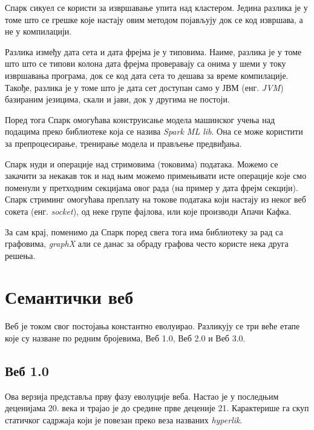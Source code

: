 \documentclass[12pt,oneside]{memoir}
\begin{document}
Спарк сикуел се користи за извршавање упита над кластером. Једина разлика је у томе што се грешке које настају овим методом појављују док се код извршава, а не у компилацији. \cite{spark_guide}

Разлика између дата сета и дата фрејма је у типовима. Наиме, разлика је у томе што што се типови колона дата фрејма проверавају са онима у шеми у току извршавања програма, док се код дата сета то дешава за време компилације. Такође, разлика је у томе што је дата сет доступан само у ЈВМ (енг. \textit{JVM}) базираним језицима, скали и јави, док у другима не постоји. \cite{spark_guide}

Поред тога Спарк омогућава конструисање модела машинског учења над подацима преко библиотеке која се назива \textit{Spark ML lib}. Она се може користити за препроцесирање, тренирање модела и прављење предвиђања. \cite{spark_guide}

Спарк нуди и операције над стримовима (токовима) података. Можемо се закачити за некакав ток и над њим можемо примењивати исте операције које смо поменули у претходним секцијама овог рада (на пример у дата фрејм секцији). Спарк стриминг омогућава преплату на токове података који настају из неког веб сокета (енг. \textit{socket}), од неке групе фајлова, или које производи Апачи Кафка. \cite{spark_streaming}

За сам крај, поменимо да Спарк поред свега тога има библиотеку за рад са графовима, \textit{graphX} али се данас за обраду графова често користе нека друга решења. \cite{spark_guide}


\chapter{Семантички веб}
\label{chp:sem_veb}

Веб је током свог постојања константно еволуирао. Разликују се три веће етапе које су назване по редним бројевима, Веб 1.0, Веб 2.0 и Веб 3.0.

\section{Веб 1.0}
\label{sec:sem_veb_veb_1}

Ова верзија представља прву фазу еволуције веба. Настао је у последњим деценијама 20. века и трајао је до средине прве деценије 21. Карактерише га скуп статичког садржаја који је повезан преко веза названих \textit{hyperlik}.
\end{document}
